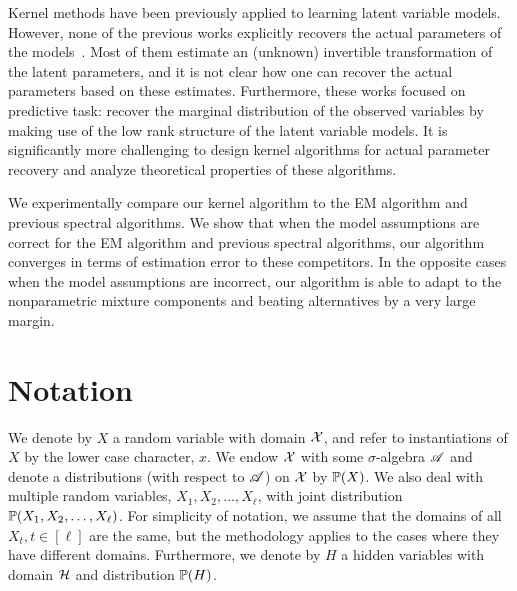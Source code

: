 \documentclass{article}
\begin{document}
 Kernel methods have  been previously applied to learning latent variable models. However, none of the previous works explicitly recovers the actual parameters of the models~\cite{xxx}. Most of them estimate an (unknown) invertible  transformation of the latent parameters, and it is not clear how one can recover the actual parameters based on these estimates. Furthermore, these works focused on predictive task: recover the marginal distribution of the observed variables by making use of the low rank structure of the latent variable models. It is significantly more challenging to design kernel algorithms for actual parameter recovery and analyze theoretical properties of these algorithms.

We  experimentally compare our kernel algorithm to the EM algorithm and previous spectral algorithms. We show that when the model assumptions are correct for the EM algorithm and previous spectral algorithms, our algorithm converges in terms of estimation error to these competitors. In the opposite cases when the model assumptions are incorrect, our algorithm is able to adapt to the nonparametric mixture components and beating alternatives by a very large margin.
 
\section{Notation}

We  denote by $X$ a random variable with domain $\mathcal{X}$,
and refer to instantiations of $X$ by the lower case character, $x$.
We endow $\mathcal{X}$ with some $\sigma$-algebra $\mathscr{A}$ and denote a distributions (with respect to $\mathscr{A}$) on $\mathcal{X}$ by $\mathbb{P}(X)$. We  also deal with multiple random variables, $X_1, X_2, \ldots, X_{\ell}$, with joint distribution $\mathbb{P}(X_1,X_2,\ldots,X_{\ell})$. For simplicity of notation, we assume that the domains of all $X_t, t \in [\ell]$ are the same, but the methodology applies to the cases where they have different domains. Furthermore, we denote by $H$ a hidden variables with domain $\mathcal{H}$ and distribution $\mathbb{P}(H)$.
\end{document}
